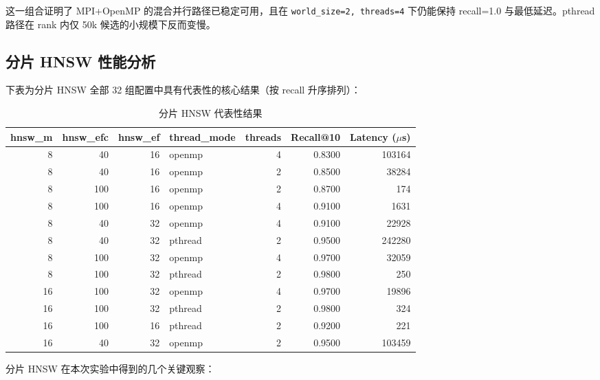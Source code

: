\documentclass[a4paper]{article}
\begin{document}
这一组合证明了 MPI+OpenMP 的混合并行路径已稳定可用，且在 \texttt{world\_size=2, threads=4} 下仍能保持 recall=1.0 与最低延迟。pthread 路径在 rank 内仅 50k 候选的小规模下反而变慢。

\subsection{分片 HNSW 性能分析}

下表为分片 HNSW 全部 32 组配置中具有代表性的核心结果（按 recall 升序排列）：

\begin{table}[H]
\centering
\small
\begin{tabular}{rrrlrrr}
\toprule
hnsw\_m & hnsw\_efc & hnsw\_ef & thread\_mode & threads & Recall@10 & Latency ($\mu$s) \\
\midrule
8 & 40 & 16 & openmp & 4 & 0.8300 & 103164 \\
8 & 40 & 16 & openmp & 2 & 0.8500 & 38284 \\
8 & 100 & 16 & openmp & 2 & 0.8700 & 174 \\
8 & 100 & 16 & openmp & 4 & 0.9100 & 1631 \\
8 & 40 & 32 & openmp & 4 & 0.9100 & 22928 \\
8 & 40 & 32 & pthread & 2 & 0.9500 & 242280 \\
8 & 100 & 32 & openmp & 4 & 0.9700 & 32059 \\
8 & 100 & 32 & pthread & 2 & 0.9800 & 250 \\
16 & 100 & 32 & openmp & 4 & 0.9700 & 19896 \\
16 & 100 & 32 & pthread & 2 & 0.9800 & 324 \\
16 & 100 & 16 & pthread & 2 & 0.9200 & 221 \\
16 & 40 & 32 & openmp & 2 & 0.9500 & 103459 \\
\bottomrule
\end{tabular}
\caption{分片 HNSW 代表性结果}
\end{table}

分片 HNSW 在本次实验中得到的几个关键观察：
\end{document}
